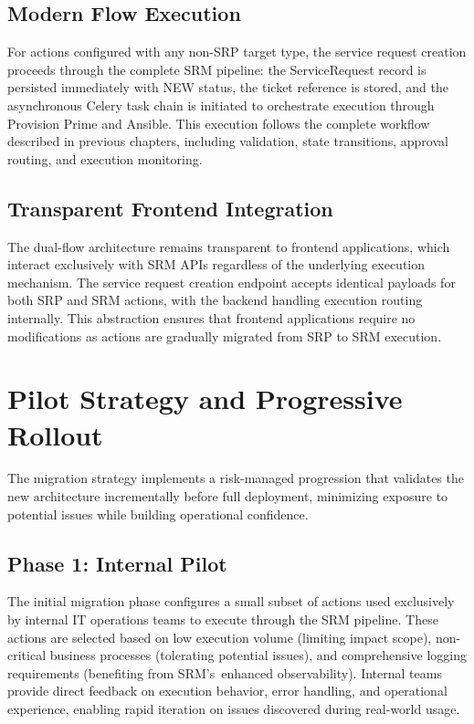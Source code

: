 \subsection{Modern Flow Execution}

For actions configured with any non-SRP target type, the service request creation proceeds through the complete SRM pipeline: the ServiceRequest record is persisted immediately with NEW status, the ticket reference is stored, and the asynchronous Celery task chain is initiated to orchestrate execution through Provision Prime and Ansible. This execution follows the complete workflow described in previous chapters, including validation, state transitions, approval routing, and execution monitoring.

\subsection{Transparent Frontend Integration}

The dual-flow architecture remains transparent to frontend applications, which interact exclusively with SRM APIs regardless of the underlying execution mechanism. The service request creation endpoint accepts identical payloads for both SRP and SRM actions, with the backend handling execution routing internally. This abstraction ensures that frontend applications require no modifications as actions are gradually migrated from SRP to SRM execution.

\section{Pilot Strategy and Progressive Rollout}

The migration strategy implements a risk-managed progression that validates the new architecture incrementally before full deployment, minimizing exposure to potential issues while building operational confidence.

\subsection{Phase 1: Internal Pilot}

The initial migration phase configures a small subset of actions used exclusively by internal IT operations teams to execute through the SRM pipeline. These actions are selected based on low execution volume (limiting impact scope), non-critical business processes (tolerating potential issues), and comprehensive logging requirements (benefiting from SRM's~enhanced observability). Internal teams provide direct feedback on execution behavior, error handling, and operational experience, enabling rapid iteration on issues discovered during real-world usage.

